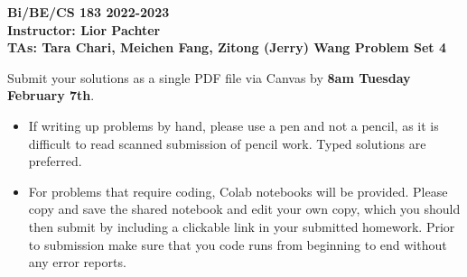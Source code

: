 \documentclass[11pt]{exam}
\begin{document}
\begin{center}

     \textbf{Bi/BE/CS 183 2022-2023\\ Instructor: Lior Pachter\\ TAs: Tara Chari, Meichen Fang, Zitong (Jerry) Wang \vskip 0.15in Problem Set 4}

\end{center}
Submit your solutions as a single PDF file via Canvas by {\bf 8am Tuesday February 7th}. 
\begin{itemize}
  \item If writing up problems by hand, please use a pen and not a pencil, as it is difficult to read scanned submission of pencil work. Typed solutions are preferred.
  \item For problems that require coding, Colab notebooks will be provided. Please copy and save the shared notebook and edit your own copy, which you should then submit by including a clickable link in your submitted homework. Prior to submission make sure that you code runs from beginning to end without any error reports.
  \end{itemize}
\end{document}
